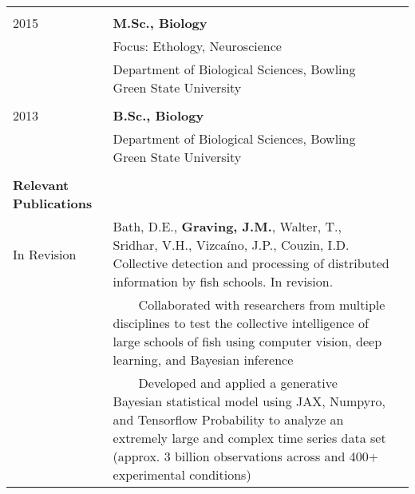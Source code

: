 \documentclass[letterpaper,10pt,oneside]{article}
\newcommand{\tabitem}{~~\hspace{5mm}\llap{ \textbullet}~~}
\begin{document}
\begin{small}
\begin{longtable}{@{} l p{5.3in}l}
     & \\
 \large{2015} 
  & \textbf{M.Sc., Biology} \\
    & Focus: Ethology, Neuroscience \\
     & {Department of Biological Sciences, Bowling Green State University} \\
    
     & \\
 \large{2013} 
  &\textbf{B.Sc., Biology} \\
      & {Department of Biological Sciences, Bowling Green State University} \\
    
     & \\
 \Large{\textbf{Relevant Publications}}  \vspace{5mm} \\
\large{In Revision}
& Bath, D.E., \textbf{Graving, J.M.}, Walter, T., Sridhar, V.H.,  Vizcaíno, J.P., Couzin, I.D. Collective detection and processing of distributed information by fish schools. In revision.  \vspace{2mm}\\
& 	\tabitem Collaborated with researchers from multiple disciplines to test the collective intelligence of large schools of fish using computer vision, deep learning, and Bayesian inference \vspace{2mm}\\
& 	\tabitem Developed and applied a generative Bayesian statistical model using JAX, Numpyro, and Tensorflow Probability to analyze an extremely large and complex time series data set (approx. 3 billion observations across and 400+ experimental conditions)  \vspace{2mm}\\


\end{longtable}
\end{small}
\end{document}

